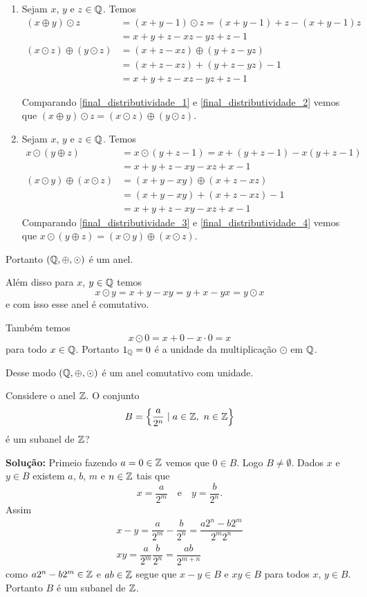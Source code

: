 \documentclass[12pt]{article}
\begin{document}
\begin{enumerate}
	\item Sejam $x$, $y$ e $z \in \mathbb{Q}$. Temos
	\begin{align}
		(x \oplus y)\odot z &= (x + y - 1) \odot z = (x + y - 1) + z - (x + y - 1)z\nonumber \\ &= x + y + z - xz - yz + z - 1\label{final_distributividade_1}\\
		(x \odot z) \oplus (y \odot z) &= (x + z - xz) \oplus (y + z - yz)\nonumber \\ &= (x + z - xz) + (y + z - yz) - 1\nonumber \\ &= x + y + z - xz - yz + z - 1\label{final_distributividade_2}
	\end{align}

	Comparando \eqref{final_distributividade_1} e \eqref{final_distributividade_2} vemos que $(x \oplus y)\odot z = (x \odot z) \oplus (y \odot z)$.

	\item Sejam $x$, $y$ e $z \in \mathbb{Q}$. Temos
	\begin{align}
		x \odot (y \oplus z) &= x \odot (y + z - 1) = x + (y + z - 1) - x(y + z - 1)\nonumber \\ &= x + y + z - xy - xz + x - 1\label{final_distributividade_3}\\
		(x \odot y) \oplus (x \odot z) &= (x + y - xy) \oplus (x + z - xz)\nonumber \\ & = (x + y - xy) + (x + z - xz) - 1\nonumber \\ &= x + y + z - xy - xz + x - 1\label{final_distributividade_4}
	\end{align}
	Comparando \eqref{final_distributividade_3} e \eqref{final_distributividade_4} vemos que $x \odot (y \oplus z) = (x \odot y) \oplus (x \odot z)$.
\end{enumerate}

Portanto $(\mathbb{Q}, \oplus, \odot)$ é um anel.

Além disso para $x$, $y \in \mathbb{Q}$ temos
\[
	x \odot y = x + y - xy = y + x - yx = y \odot x
\]
e com isso esse anel é comutativo.

Também temos
\[
	x \odot 0 = x + 0 - x\cdot 0 = x
\]
para todo $x \in \mathbb{Q}$. Portanto $1_{\mathbb{Q}} = 0$ é a unidade da multiplicação $\odot$ em $\mathbb{Q}$.

Desse modo $(\mathbb{Q}, \oplus, \odot)$ é um anel comutativo com unidade.

\vspace{.5cm}

\questao Considere o anel $\mathbb{Z}$. O conjunto
\[
	B = \left\{ \dfrac{a}{2^n} \mid a \in \z,\ n \in \z\right\}
\]
é um subanel de $\mathbb{Z}$?

\noindent\textbf{Solu\c{c}\~ao:} Primeio fazendo $a = 0 \in \mathbb{Z}$ vemos que $0 \in B$. Logo $B \ne \emptyset$. Dados $x$ e $y \in B$ existem $a$, $b$, $m$ e $n \in \mathbb{Z}$ tais que
\[
	x = \dfrac{a}{2^m} \quad \mbox{e} \quad y = \dfrac{b}{2^n}.
\]
Assim
\begin{align*}
	x - y = \dfrac{a}{2^m} - \dfrac{b}{2^n} = \dfrac{a2^n - b2^m}{2^m2^n}\\
	xy = \dfrac{a}{2^m}\dfrac{b}{2^n} = \dfrac{ab}{2^{m + n}}
\end{align*}
como $a2^n - b2^m \in \mathbb{Z}$ e $ab \in \mathbb{Z}$ segue que $x - y \in B$ e $xy \in B$ para todos $x$, $y \in B$. Portanto $B$ é um subanel de $\mathbb{Z}$.
\end{document}
